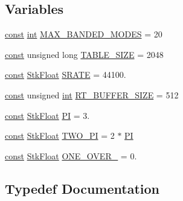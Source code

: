 \subsection*{Variables}
\begin{DoxyCompactItemize}
\item 
\hyperlink{getopt1_8c_a2c212835823e3c54a8ab6d95c652660e}{const} \hyperlink{xmltok_8h_a5a0d4a5641ce434f1d23533f2b2e6653}{int} \hyperlink{namespace_nyq_a3b6b7f1245b5eed8518a8240035c74cb}{M\+A\+X\+\_\+\+B\+A\+N\+D\+E\+D\+\_\+\+M\+O\+D\+ES} = 20
\item 
\hyperlink{getopt1_8c_a2c212835823e3c54a8ab6d95c652660e}{const} unsigned long \hyperlink{namespace_nyq_a67d17f86466f80afd7afb29516166ce3}{T\+A\+B\+L\+E\+\_\+\+S\+I\+ZE} = 2048
\item 
\hyperlink{getopt1_8c_a2c212835823e3c54a8ab6d95c652660e}{const} \hyperlink{namespace_nyq_a044fa20a706520a617bbbf458a7db7e4}{Stk\+Float} \hyperlink{namespace_nyq_ab44c80bc2c6c5651f7994c235dc47a96}{S\+R\+A\+TE} = 44100.
\item 
\hyperlink{getopt1_8c_a2c212835823e3c54a8ab6d95c652660e}{const} unsigned \hyperlink{xmltok_8h_a5a0d4a5641ce434f1d23533f2b2e6653}{int} \hyperlink{namespace_nyq_a0a67b8d33566f4de1860c6b56df627e0}{R\+T\+\_\+\+B\+U\+F\+F\+E\+R\+\_\+\+S\+I\+ZE} = 512
\item 
\hyperlink{getopt1_8c_a2c212835823e3c54a8ab6d95c652660e}{const} \hyperlink{namespace_nyq_a044fa20a706520a617bbbf458a7db7e4}{Stk\+Float} \hyperlink{namespace_nyq_aaf0ff881e68ea0ef8a4940d4df6fadb9}{PI} = 3.
\item 
\hyperlink{getopt1_8c_a2c212835823e3c54a8ab6d95c652660e}{const} \hyperlink{namespace_nyq_a044fa20a706520a617bbbf458a7db7e4}{Stk\+Float} \hyperlink{namespace_nyq_a90fefc442f0ed5cdf097908e99dd6eb2}{T\+W\+O\+\_\+\+PI} = 2 $\ast$ \hyperlink{namespace_nyq_aaf0ff881e68ea0ef8a4940d4df6fadb9}{PI}
\item 
\hyperlink{getopt1_8c_a2c212835823e3c54a8ab6d95c652660e}{const} \hyperlink{namespace_nyq_a044fa20a706520a617bbbf458a7db7e4}{Stk\+Float} \hyperlink{namespace_nyq_a4404681fcca31b59c925452f3252697b}{O\+N\+E\+\_\+\+O\+V\+E\+R\+\_} = 0.
\end{DoxyCompactItemize}


\subsection{Typedef Documentation}
